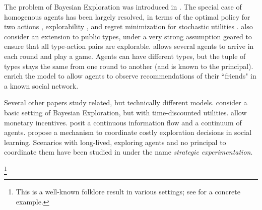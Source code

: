 
The problem of Bayesian Exploration was introduced in \cite{Kremer-JPE14}. The special case of homogenous agents has been largely resolved, in terms of the optimal policy for two actions \cite{Kremer-JPE14}, explorability \cite{ICexplorationGames-ec16-working}, and regret minimization for stochastic utilities \cite{ICexploration-ec15}. \cite{ICexploration-ec15} also consider an extension to public types, under a very strong assumption geared to ensure that all type-action pairs are explorable. \cite{ICexplorationGames-ec16-working} allows several agents to arrive in each round and play a game. Agents can have different types, but the tuple of types stays the same from one round to another (and is known to the principal). \cite{Bahar-ec16} enrich the model to allow agents to observe recommendations of their ``friends" in a known social network.

Several other papers study related, but technically different models. \cite{Bimpikis-exploration-ms17} consider a basic setting of Bayesian Exploration, but with time-discounted utilities. \cite{Frazier-ec14,Kempe-colt18} allow monetary incentives. \cite{Che-13} posit a continuous information flow and a continuum of agents. \cite{Bobby-Glen-ec16} propose a mechanism to coordinate costly exploration decisions in social learning. Scenarios with long-lived, exploring agents and no principal to coordinate them have been studied in \cite{Bolton-econometrica99,Keller-econometrica05} under the name \emph{strategic experimentation}.



%
\footnote{This is a well-known folklore result in various settings; \eg see \cite{CompetingBandits-itcs18,Sven-aistats18} for a concrete example.}


